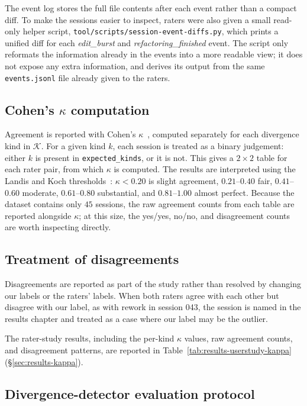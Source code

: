 The event log stores the full file contents after each event rather than a compact diff. To make the sessions easier to inspect, raters were also given a small read-only helper script, \texttt{tool/scripts/session-event-diffs.py}, which prints a unified diff for each \emph{edit\_burst} and \emph{refactoring\_finished} event. The script only reformats the information already in the events into a more readable view; it does not expose any extra information, and derives its output from the same \texttt{events.jsonl} file already given to the raters.

\subsection{Cohen's $\kappa$ computation}
\label{sec:methodology-kappa}

Agreement is reported with Cohen's $\kappa$~\cite{cohen1960kappa}, computed separately for each divergence kind in $\mathcal{K}$. For a given kind $k$, each session is treated as a binary judgement: either $k$ is present in \texttt{expected\_kinds}, or it is not. This gives a $2 \times 2$ table for each rater pair, from which $\kappa$ is computed. The results are interpreted using the Landis and Koch thresholds~\cite{landis1977kappa}: $\kappa < 0.20$ is slight agreement, $0.21$--$0.40$ fair, $0.41$--$0.60$ moderate, $0.61$--$0.80$ substantial, and $0.81$--$1.00$ almost perfect. Because the dataset contains only $45$ sessions, the raw agreement counts from each table are reported alongside $\kappa$; at this size, the yes/yes, no/no, and disagreement counts are worth inspecting directly.

\subsection{Treatment of disagreements}
\label{sec:methodology-disagreements}

Disagreements are reported as part of the study rather than resolved by changing our labels or the raters' labels. When both raters agree with each other but disagree with our label, as with rework in session 043, the session is named in the results chapter and treated as a case where our label may be the outlier.

The rater-study results, including the per-kind $\kappa$ values, raw agreement counts, and disagreement patterns, are reported in Table~\ref{tab:results-userstudy-kappa} (\S\ref{sec:results-kappa}).

\subsection{Divergence-detector evaluation protocol}
\label{sec:methodology-detector-eval}

